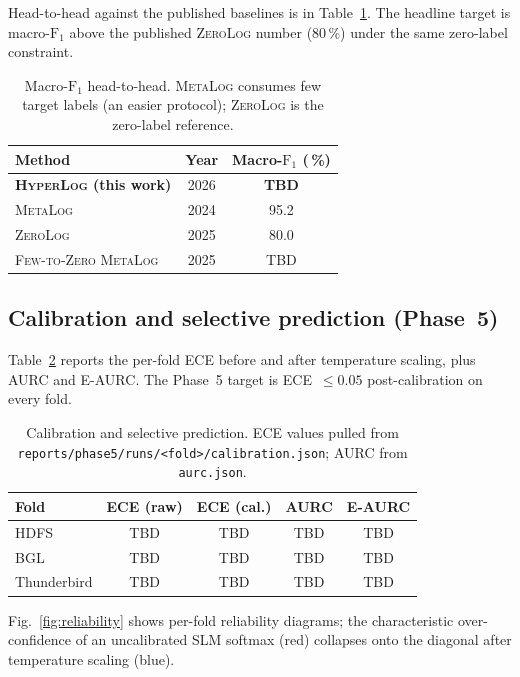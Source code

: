 \documentclass[journal, twoside]{IEEEtran}
\newcommand{\hylog}{\textsc{HyperLog}}
\newcommand{\ece}{\textsc{ECE}}
\newcommand{\aurc}{\textsc{AURC}}
\newcommand{\eaurc}{\textsc{E-AURC}}
\newcommand{\fone}{$\text{F}_1$}
\begin{document}
Head-to-head against the published baselines is in
Table~\ref{tab:headtohead}. The headline target is macro-\fone{} above
the published \textsc{ZeroLog} number (80\,\%) under the same
zero-label constraint.

\begin{table}[t]
\centering
\caption{Macro-\fone{} head-to-head. \textsc{MetaLog} consumes few
target labels (an easier protocol); \textsc{ZeroLog} is the
zero-label reference.}
\label{tab:headtohead}
\begin{tabular}{lcc}
\toprule
Method & Year & Macro-\fone{} (\,\%) \\
\midrule
\textbf{\hylog{} (this work)} & 2026 & \textbf{TBD} \\
\textsc{MetaLog} \cite{metalog2024}      & 2024 & 95.2 \\
\textsc{ZeroLog} \cite{zerolog2025}      & 2025 & 80.0 \\
\textsc{Few-to-Zero MetaLog} \cite{fewzero2025} & 2025 & TBD \\
\bottomrule
\end{tabular}
\end{table}

\subsection{Calibration and selective prediction (Phase~5)}\label{sec:results:cal}

Table~\ref{tab:calibration} reports the per-fold \ece{} before and
after temperature scaling, plus \aurc{} and \eaurc{}. The
Phase~5 target is \ece{}~$\le 0.05$ post-calibration on every fold.

\begin{table}[t]
\centering
\caption{Calibration and selective prediction. ECE values pulled from
\texttt{reports/phase5/runs/<fold>/calibration.json};
AURC from \texttt{aurc.json}.}
\label{tab:calibration}
\begin{tabular}{lcccc}
\toprule
Fold & ECE (raw) & ECE (cal.) & \aurc{} & \eaurc{} \\
\midrule
HDFS         & TBD & TBD & TBD & TBD \\
BGL          & TBD & TBD & TBD & TBD \\
Thunderbird  & TBD & TBD & TBD & TBD \\
\bottomrule
\end{tabular}
\end{table}

Fig.~\ref{fig:reliability} shows per-fold reliability diagrams; the
characteristic over-confidence of an uncalibrated SLM softmax (red)
collapses onto the diagonal after temperature scaling (blue).
\end{document}
